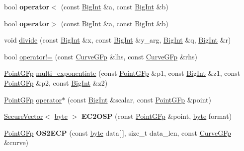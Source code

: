 \begin{DoxyCompactItemize}
\item 
\hypertarget{namespaceBotan_a661756a0681456da17b09d32d0f66a9e}{bool {\bfseries operator$<$} (const \hyperlink{classBotan_1_1BigInt}{Big\-Int} \&a, const \hyperlink{classBotan_1_1BigInt}{Big\-Int} \&b)}\label{namespaceBotan_a661756a0681456da17b09d32d0f66a9e}

\item 
\hypertarget{namespaceBotan_af2298f10cbf9e9d22db9fe7a3f8fb062}{bool {\bfseries operator$>$} (const \hyperlink{classBotan_1_1BigInt}{Big\-Int} \&a, const \hyperlink{classBotan_1_1BigInt}{Big\-Int} \&b)}\label{namespaceBotan_af2298f10cbf9e9d22db9fe7a3f8fb062}

\item 
void \hyperlink{namespaceBotan_aa64449e9696de8b65de43b7410560384}{divide} (const \hyperlink{classBotan_1_1BigInt}{Big\-Int} \&x, const \hyperlink{classBotan_1_1BigInt}{Big\-Int} \&y\-\_\-arg, \hyperlink{classBotan_1_1BigInt}{Big\-Int} \&q, \hyperlink{classBotan_1_1BigInt}{Big\-Int} \&r)
\item 
bool \hyperlink{namespaceBotan_a0dd2cd53144b9dd0eafcf6f8d0c5d3a1}{operator!=} (const \hyperlink{classBotan_1_1CurveGFp}{Curve\-G\-Fp} \&lhs, const \hyperlink{classBotan_1_1CurveGFp}{Curve\-G\-Fp} \&rhs)
\item 
\hyperlink{classBotan_1_1PointGFp}{Point\-G\-Fp} \hyperlink{namespaceBotan_a57f9a00bf395961b6c9792a96058e811}{multi\-\_\-exponentiate} (const \hyperlink{classBotan_1_1PointGFp}{Point\-G\-Fp} \&p1, const \hyperlink{classBotan_1_1BigInt}{Big\-Int} \&z1, const \hyperlink{classBotan_1_1PointGFp}{Point\-G\-Fp} \&p2, const \hyperlink{classBotan_1_1BigInt}{Big\-Int} \&z2)
\item 
\hyperlink{classBotan_1_1PointGFp}{Point\-G\-Fp} \hyperlink{namespaceBotan_a8f3c371fa5a447f50ee58bd9b3f127e1}{operator$\ast$} (const \hyperlink{classBotan_1_1BigInt}{Big\-Int} \&scalar, const \hyperlink{classBotan_1_1PointGFp}{Point\-G\-Fp} \&point)
\item 
\hypertarget{namespaceBotan_ad1d33cf57b19f8b0ada37c4c956ccd22}{\hyperlink{classBotan_1_1SecureVector}{Secure\-Vector}$<$ \hyperlink{namespaceBotan_a7d793989d801281df48c6b19616b8b84}{byte} $>$ {\bfseries E\-C2\-O\-S\-P} (const \hyperlink{classBotan_1_1PointGFp}{Point\-G\-Fp} \&point, \hyperlink{namespaceBotan_a7d793989d801281df48c6b19616b8b84}{byte} format)}\label{namespaceBotan_ad1d33cf57b19f8b0ada37c4c956ccd22}

\item 
\hypertarget{namespaceBotan_aa79750fb5abdcc12c58dca700e4b5519}{\hyperlink{classBotan_1_1PointGFp}{Point\-G\-Fp} {\bfseries O\-S2\-E\-C\-P} (const \hyperlink{namespaceBotan_a7d793989d801281df48c6b19616b8b84}{byte} data\mbox{[}$\,$\mbox{]}, size\-\_\-t data\-\_\-len, const \hyperlink{classBotan_1_1CurveGFp}{Curve\-G\-Fp} \&curve)}\label{namespaceBotan_aa79750fb5abdcc12c58dca700e4b5519}


\end{DoxyCompactItemize}
